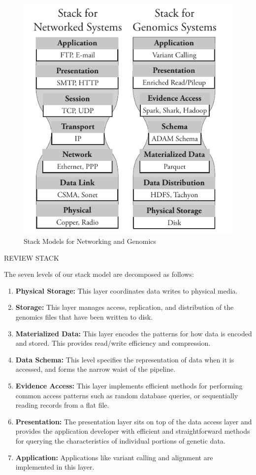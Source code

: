 \documentclass[10pt,twocolumn]{article}
\theoremstyle{plain}
\begin{document}
\begin{figure}[h]
\begin{center}
\includegraphics[width=0.9\linewidth]{stack-model.pdf}
\end{center}
\caption{Stack Models for Networking and Genomics}
\label{fig:stack-model}
\end{figure}

REVIEW STACK

The seven levels of our stack model are decomposed as follows:

\begin{enumerate}
\item {\bf Physical Storage:} This layer coordinates data writes to physical media.
\item {\bf Storage:} This layer manages access, replication, and distribution of the genomics files that have been written to disk.
\item {\bf Materialized Data:} This layer encodes the patterns for how data is encoded and stored. This provides read/write efficiency
and compression.
\item {\bf Data Schema:} This level specifies the representation of data when it is accessed, and forms the narrow waist of the pipeline.
\item {\bf Evidence Access:} This layer implements efficient methods for performing common access patterns such as random database
queries, or sequentially reading records from a flat file.
\item {\bf Presentation:} The presentation layer sits on top of the data access layer and provides the application developer with efficient and
straightforward methods for querying the characteristics of individual portions of genetic data.
\item {\bf Application:} Applications like variant calling and alignment are implemented in this layer.
\end{enumerate}
\end{document}
